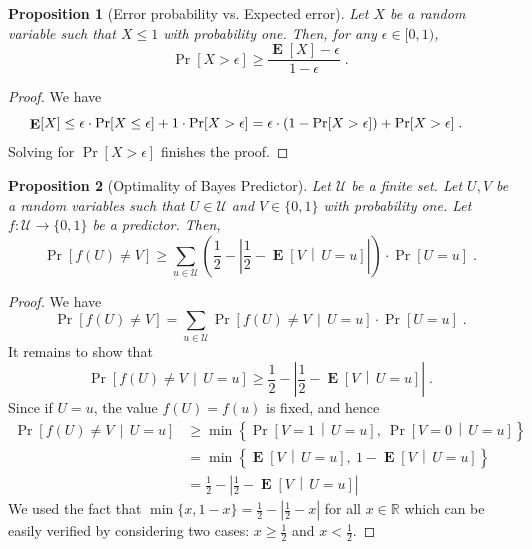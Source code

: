 \documentclass[10pt]{article}
\newtheorem{proposition}{Proposition}
\newcommand{\R}{\mathbb{R}}
\DeclareMathOperator{\Exp}{\mathbf{E}}
\begin{document}
\begin{proposition}[Error probability vs. Expected error]
Let $X$ be a random variable such that $X \le 1$ with probability one.
Then, for any $\epsilon \in [0, 1)$,
$$
\Pr[X > \epsilon] \ge \frac{\Exp[X] - \epsilon}{1 - \epsilon} \; .
$$
\end{proposition}

\begin{proof}
We have
$$
\Exp[X]
\le \epsilon \cdot \Pr[X \le \epsilon] + 1 \cdot \Pr[X > \epsilon]
= \epsilon \cdot (1 - \Pr[X > \epsilon]) + \Pr[X > \epsilon] \; .  \qquad \qedhere
$$
Solving for $\Pr[X > \epsilon]$ finishes the proof.
\end{proof}

\begin{proposition}[Optimality of Bayes Predictor]
Let $\mathcal{U}$ be a finite set. Let $U,V$ be a random variables such that $U \in \mathcal{U}$ and $V \in \{0,1\}$ with probability one.
Let $f:\mathcal{U} \to \{0,1\}$ be a predictor. Then,
$$
\Pr\left[ f(U) \neq V \right]
\ge \sum_{u \in \mathcal{U}} \left( \frac{1}{2} - \left| \frac{1}{2} -  \Exp \left[V \, \middle| \, U = u\right] \right| \right) \cdot \Pr[U = u] \; .
$$
\end{proposition}

\begin{proof}
We have
$$
\Pr \left[ f(U) \neq V \right] = \sum_{u \in \mathcal{U}} \Pr \left[ f(U) \neq V \, \middle| \, U = u \right] \cdot \Pr[U = u] \; .
$$
It remains to show that
$$
\Pr\left[ f(U) \neq V \, \middle| \, U = u \right]
\ge
\frac{1}{2} - \left| \frac{1}{2} -  \Exp \left[V \, \middle| \, U = u \right] \right| \; .
$$
Since if  $U=u$, the value $f(U) = f(u)$ is fixed, and hence
\begin{align*}
\Pr\left[ f(U) \neq V \, \middle| \, U = u \right]
& \ge \min\left\{ \Pr \left[ V = 1 \, \middle| \, U = u \right], \ \Pr \left[ V = 0 \, \middle| \, U = u \right] \right\} \\
& = \min\left\{ \Exp \left[ V  \, \middle| \, U = u \right], \ 1 - \Exp \left[ V \, \middle| \, U = u \right] \right\} \\
& = \frac{1}{2} - \left| \frac{1}{2} -  \Exp \left[ V  \, \middle| \, U = u \right] \right|
\end{align*}
We used the fact that $\min\{x, 1 - x\} = \frac{1}{2} - \left| \frac{1}{2} - x \right|$ for all $x \in \R$
which can be easily verified by considering two cases: $x \ge \frac{1}{2}$ and $x < \frac{1}{2}$.
\end{proof}
\end{document}
